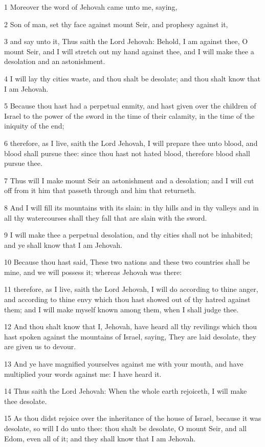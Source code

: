 \par 1 Moreover the word of Jehovah came unto me, saying,
\par 2 Son of man, set thy face against mount Seir, and prophesy against it,
\par 3 and say unto it, Thus saith the Lord Jehovah: Behold, I am against thee, O mount Seir, and I will stretch out my hand against thee, and I will make thee a desolation and an astonishment.
\par 4 I will lay thy cities waste, and thou shalt be desolate; and thou shalt know that I am Jehovah.
\par 5 Because thou hast had a perpetual enmity, and hast given over the children of Israel to the power of the sword in the time of their calamity, in the time of the iniquity of the end;
\par 6 therefore, as I live, saith the Lord Jehovah, I will prepare thee unto blood, and blood shall pursue thee: since thou hast not hated blood, therefore blood shall pursue thee.
\par 7 Thus will I make mount Seir an astonishment and a desolation; and I will cut off from it him that passeth through and him that returneth.
\par 8 And I will fill its mountains with its slain: in thy hills and in thy valleys and in all thy watercourses shall they fall that are slain with the sword.
\par 9 I will make thee a perpetual desolation, and thy cities shall not be inhabited; and ye shall know that I am Jehovah.
\par 10 Because thou hast said, These two nations and these two countries shall be mine, and we will possess it; whereas Jehovah was there:
\par 11 therefore, as I live, saith the Lord Jehovah, I will do according to thine anger, and according to thine envy which thou hast showed out of thy hatred against them; and I will make myself known among them, when I shall judge thee.
\par 12 And thou shalt know that I, Jehovah, have heard all thy revilings which thou hast spoken against the mountains of Israel, saying, They are laid desolate, they are given us to devour.
\par 13 And ye have magnified yourselves against me with your mouth, and have multiplied your words against me: I have heard it.
\par 14 Thus saith the Lord Jehovah: When the whole earth rejoiceth, I will make thee desolate.
\par 15 As thou didst rejoice over the inheritance of the house of Israel, because it was desolate, so will I do unto thee: thou shalt be desolate, O mount Seir, and all Edom, even all of it; and they shall know that I am Jehovah.

